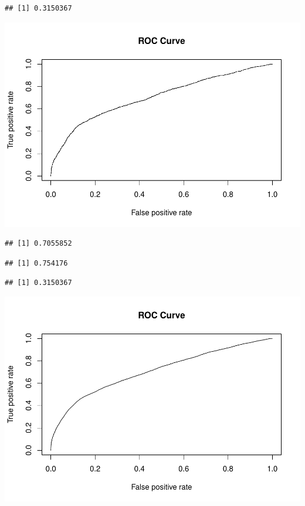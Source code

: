 \documentclass[american,]{article}
\begin{document}
\begin{verbatim}
## [1] 0.3150367
\end{verbatim}

\includegraphics{Final_Project_Applied_files/figure-latex/External CV-1.pdf}

\begin{verbatim}
## [1] 0.7055852
\end{verbatim}

\begin{verbatim}
## [1] 0.754176
\end{verbatim}

\begin{verbatim}
## [1] 0.3150367
\end{verbatim}

\includegraphics{Final_Project_Applied_files/figure-latex/External CV-2.pdf}
\end{document}
